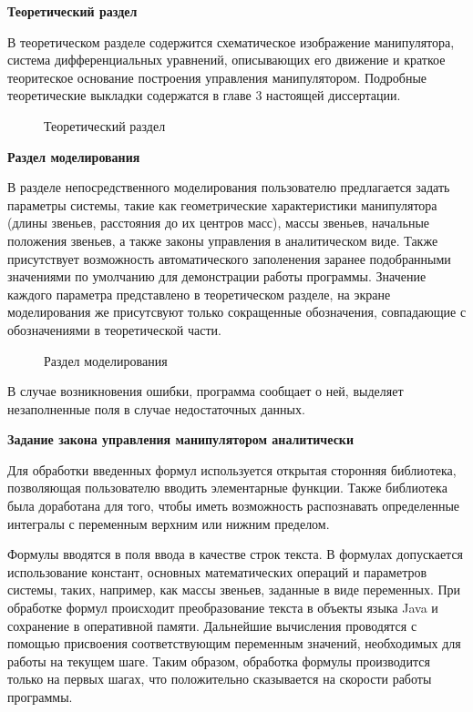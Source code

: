 \par
\textbf{Теоретический раздел}

В теоретическом разделе содержится схематическое изображение манипулятора, система дифференциальных уравнений, описывающих его движение и краткое теоритеское основание построения управления манипулятором. Подробные теоретические выкладки содержатся в главе 3 настоящей  диссертации.
\nopagebreak[4]
\begin{figure}[h]
\caption{Теоретический раздел}
\label{ris:theory}
\end{figure} 

\par
\textbf{Раздел моделирования}

В разделе непосредственного моделирования пользователю предлагается задать параметры системы, такие как геометрические характеристики манипулятора (длины звеньев, расстояния до их центров масс), массы звеньев, начальные положения звеньев, а также законы управления в аналитическом виде. Также присутствует возможность автоматического заполенения заранее подобранными значениями по умолчанию для демонстрации работы программы. Значение каждого параметра представлено в теоретическом разделе, на экране моделирования же присутсвуют только сокращенные обозначения, совпадающие с обозначениями в теоретической части.

\begin{figure}[h]
\caption{Раздел моделирования}
\label{ris:modeling}
\end{figure}

В случае возникновения ошибки, программа сообщает о ней, выделяет незаполненные поля в случае недостаточных данных.
\par
\textbf{Задание закона управления манипулятором аналитически}

Для обработки введенных формул используется открытая сторонняя библиотека, позволяющая пользователю вводить элементарные функции. Также библиотека была доработана для того, чтобы иметь возможность распознавать определенные интегралы с переменным верхним или нижним пределом.

Формулы вводятся в поля ввода в качестве строк текста. В формулах допускается использование констант, основных математических операций и параметров системы, таких, например, как массы звеньев, заданные в виде переменных. При обработке формул происходит преобразование текста в объекты языка Java и сохранение в оперативной памяти. Дальнейшие вычисления проводятся с помощью присвоения соответствующим переменным значений, необходимых для работы на текущем шаге. Таким образом, обработка формулы производится только на первых шагах, что положительно сказывается на скорости работы программы.

